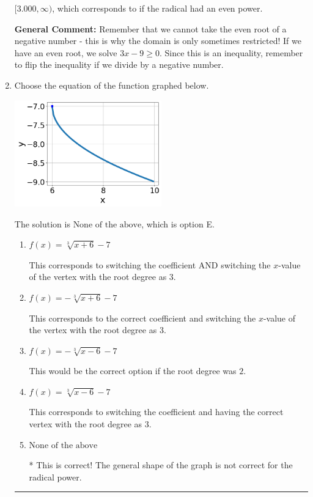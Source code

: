\documentclass{extbook}[14pt]
\newcommand{\litem}[1]{\item #1

\rule{\textwidth}{0.4pt}}
\begin{document}
\begin{enumerate}
{\begin{enumerate}[label=\Alph*.]
$[3.000, \infty)$, which corresponds to if the radical had an even power.
\end{enumerate}

\textbf{General Comment:} Remember that we cannot take the even root of a negative number - this is why the domain is only sometimes restricted! If we have an even root, we solve $3 x - 9 \geq 0$. Since this is an inequality, remember to flip the inequality if we divide by a negative number.
}
\litem{
Choose the equation of the function graphed below.

\begin{center}
    \includegraphics[width=0.5\textwidth]{../Figures/radicalGraphToEquationCopyA.png}
\end{center}




The solution is \( \text{None of the above} \), which is option E.\begin{enumerate}[label=\Alph*.]
\item \( f(x) = \sqrt[3]{x + 6} - 7 \)

This corresponds to switching the coefficient AND switching the $x$-value of the vertex with the root degree as $3$.
\item \( f(x) = - \sqrt[3]{x + 6} - 7 \)

This corresponds to the correct coefficient and switching the $x$-value of the vertex with the root degree as $3$.
\item \( f(x) = - \sqrt[3]{x - 6} - 7 \)

This would be the correct option if the root degree was $2$.
\item \( f(x) = \sqrt[3]{x - 6} - 7 \)

This corresponds to switching the coefficient and having the correct vertex with the root degree as $3$.
\item \( \text{None of the above} \)

* This is correct! The general shape of the graph is not correct for the radical power.
\end{enumerate}

}
\end{enumerate}
\end{document}
